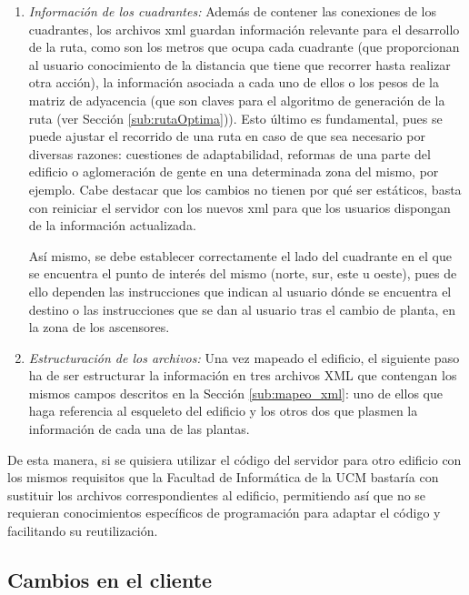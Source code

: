 \begin{enumerate}
	\item \textit{Información de los cuadrantes:} Además de contener las conexiones de los cuadrantes, los archivos xml guardan información relevante para el desarrollo de la ruta, como son los metros que ocupa cada cuadrante (que proporcionan al usuario conocimiento de la distancia que tiene que recorrer hasta realizar otra acción), la información asociada a cada uno de ellos o los pesos de la matriz de adyacencia (que son claves para el algoritmo de generación de la ruta (ver Sección \ref{sub:rutaOptima})). Esto último es fundamental, pues se puede ajustar el recorrido de una ruta en caso de que sea necesario por diversas razones: cuestiones de adaptabilidad, reformas de una parte del edificio o aglomeración de gente en una determinada zona del mismo, por ejemplo. Cabe destacar que los cambios no tienen por qué ser estáticos, basta con reiniciar el servidor con los nuevos xml para que los usuarios dispongan de la información actualizada. 
	
	Así mismo, se debe establecer correctamente el lado del cuadrante en el que se encuentra el punto de interés del mismo (norte, sur, este u oeste), pues de ello dependen las instrucciones que indican al usuario dónde se encuentra el destino o las instrucciones que se dan al usuario tras el cambio de planta, en la zona de los ascensores.
	
	\item \textit{Estructuración de los archivos:} Una vez mapeado el edificio, el siguiente paso ha de ser estructurar la información en tres archivos XML que contengan los mismos campos descritos en la Sección \ref{sub:mapeo_xml}: uno de ellos que haga referencia al esqueleto del edificio y los otros dos que plasmen la información de cada una de las plantas.
	
\end{enumerate}

De esta manera, si se quisiera utilizar el código del servidor para otro edificio con los mismos requisitos que la Facultad de Informática de la UCM bastaría con sustituir los archivos correspondientes al edificio, permitiendo así que no se requieran conocimientos específicos de programación para adaptar el código y facilitando su reutilización.


\subsection{Cambios en el cliente}
\label{sub:cambiosCliente}


